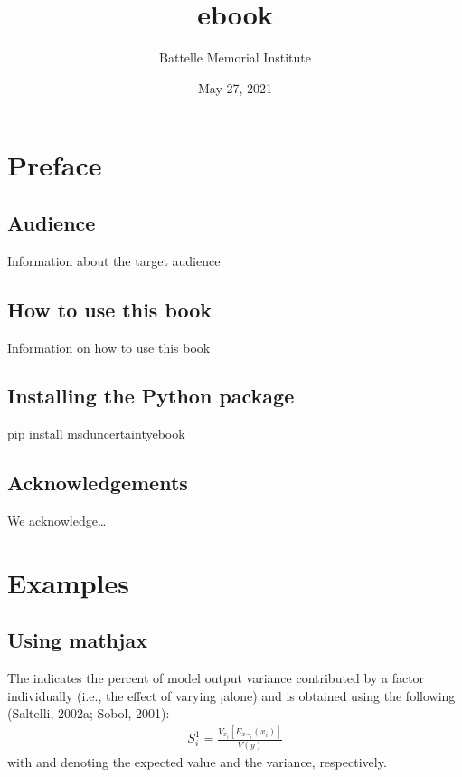 \documentclass[letterpaper,10pt,english]{sphinxmanual}
\title{ebook}
\date{May 27, 2021}
\author{Battelle Memorial Institute}
\begin{document}
\pagestyle{empty}
\sphinxmaketitle
\pagestyle{plain}
\sphinxtableofcontents
\pagestyle{normal}
\label{\detokenize{index::doc}}



\chapter{Preface}
\label{\detokenize{index:preface}}

\section{Audience}
\label{\detokenize{index:audience}}
\sphinxAtStartPar
Information about the target audience


\section{How to use this book}
\label{\detokenize{index:how-to-use-this-book}}
\sphinxAtStartPar
Information on how to use this book


\section{Installing the  Python package}
\label{\detokenize{index:installing-the-msd-uncertainty-ebook-python-package}}
\begin{sphinxVerbatim}[commandchars=\\\{\}]
pip install msd\PYGZus{}uncertainty\PYGZus{}ebook
\end{sphinxVerbatim}


\section{Acknowledgements}
\label{\detokenize{index:acknowledgements}}
\sphinxAtStartPar
We acknowledge…


\chapter{Examples}
\label{\detokenize{index:examples}}

\section{Using mathjax}
\label{\detokenize{index:using-mathjax}}
\sphinxAtStartPar
The  indicates the percent of model output variance contributed by a factor individually (i.e., the effect of varying $_{\text{i}}$alone) and is obtained using the following (Saltelli, 2002a; Sobol, 2001):
\begin{equation*}
\begin{split}S_i^1 = \frac{V_{x_i} [E_{x\sim_i} (x_i)]}{V(y)}\end{split}
\end{equation*}
\sphinxAtStartPar
with  and  denoting the expected value and the variance, respectively.
\end{document}
